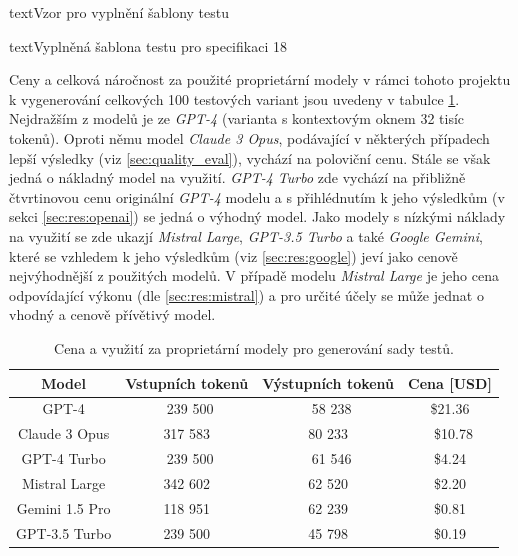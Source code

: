 \documentclass[czech, ma, kiv, he, iso690numb, pdf, viewonly]{fasthesis}
\begin{document}
\begin{code}{text}{Vzor pro vyplnění šablony testu \label{lst:template}}
{\begin{code}{text}{Vyplněná šablona testu pro specifikaci 18 \label{lst:spec18}}
{    Ceny a celková náročnost za použité proprietární modely v rámci tohoto projektu k vygenerování celkových 100 testových variant jsou uvedeny v tabulce \ref{tab:eval:price}. Nejdražším z modelů je ze \textit{GPT-4} (varianta s kontextovým oknem 32 tisíc tokenů). Oproti němu model \textit{Claude 3 Opus}, podávající v některých případech lepší výsledky (viz \ref{sec:quality_eval}), vychází na poloviční cenu. Stále se však jedná o nákladný model na využití. \textit{GPT-4 Turbo} zde vychází na přibližně čtvrtinovou cenu originální \textit{GPT-4} modelu a s přihlédnutím k jeho výsledkům (v sekci \ref{sec:res:openai}) se jedná o výhodný model. Jako modely s nízkými náklady na využití se zde ukazjí \textit{Mistral Large}, \textit{GPT-3.5 Turbo} a také \textit{Google Gemini}, které se vzhledem k jeho výsledkům (viz \ref{sec:res:google}) jeví jako cenově nejvýhodnější z použitých modelů. V případě modelu \textit{Mistral Large} je jeho cena odpovídající výkonu (dle \ref{sec:res:mistral}) a pro určité účely se může jednat o vhodný a cenově přívětivý model.

    \begin{table}[H]
        \begin{tabular}{|c|c|c|c|}
            \hline
            \textbf{Model} & \textbf{Vstupních tokenů} & \textbf{Výstupních tokenů} & \textbf{Cena} [USD] \\
            \hline
            GPT-4 & 239 500 & 58 238 & \$21.36 \\
            \hline
            Claude 3 Opus & 317 583 & 80 233 & \$10.78 \\
            \hline
            GPT-4 Turbo & 239 500 & 61 546 & \$4.24 \\
            \hline
            Mistral Large & 342 602 & 62 520 & \$2.20 \\
            \hline
            Gemini 1.5 Pro & 118 951 & 62 239 & \$0.81 \\
            \hline
            GPT-3.5 Turbo & 239 500 & 45 798 & \$0.19 \\
            \hline
        \end{tabular}
        \centering
        \caption{Cena a využití za proprietární modely pro generování sady testů.}
        \label{tab:eval:price}
    \end{table}

}
\end{code}}
\end{code}
\end{document}
